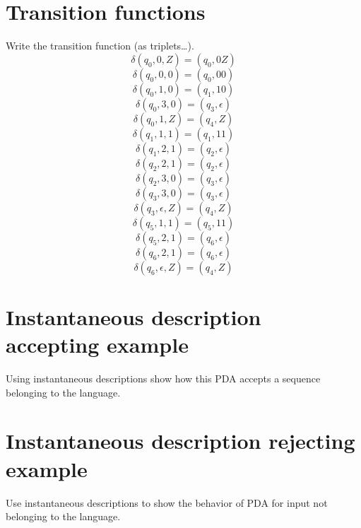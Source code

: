\documentclass{report}[pt12]
\begin{document}
\chapter{Transition functions}
Write the transition function (as triplets…).
\[ \delta(q_0, 0, Z) = (q_0, 0Z) \]
\[ \delta(q_0, 0, 0) = (q_0, 00) \]
\[ \delta(q_0, 1, 0) = (q_1, 10) \]
\[ \delta(q_0, 3, 0) = (q_3, \epsilon) \]
\[ \delta(q_0, 1, Z) = (q_4, Z) \]
\[ \delta(q_1, 1, 1) = (q_1, 11) \]
\[ \delta(q_1, 2, 1) = (q_2, \epsilon) \]
\[ \delta(q_2, 2, 1) = (q_2, \epsilon) \]
\[ \delta(q_2, 3, 0) = (q_3, \epsilon) \]
\[ \delta(q_3, 3, 0) = (q_3, \epsilon) \]
\[ \delta(q_3, \epsilon, Z) = (q_4, Z) \]
\[ \delta(q_5, 1, 1) = (q_5, 11) \]
\[ \delta(q_5, 2, 1) = (q_6, \epsilon) \]
\[ \delta(q_6, 2, 1) = (q_6, \epsilon) \]
\[ \delta(q_6, \epsilon, Z) = (q_4, Z) \]

\chapter{Instantaneous description accepting example}
Using instantaneous descriptions show how this PDA accepts a sequence belonging to the language.
\chapter{Instantaneous description rejecting example}
Use instantaneous descriptions to show the behavior of PDA for input not belonging to the language.
\end{document}
